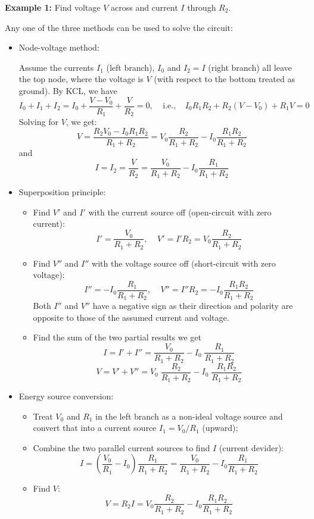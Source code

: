 \begin{itemize}
{\bf Example 1:} Find voltage $V$ across and current $I$ through $R_2$.


Any one of the three methods can be used to solve the circuit:
\begin{itemize}

\item Node-voltage method:

  Assume the currents $I_1$ (left branch), $I_0$ and $I_2=I$ (right branch)
  all leave the top node, where the voltage is $V$ (with respect to the 
  bottom treated as ground). By KCL, we have
  \[
  I_0+I_1+I_2=I_0+\frac{V-V_0}{R_1}+\frac{V}{R_2}=0,\;\;\;\;\mbox{i.e.,}\;\;\;\;
  I_0R_1R_2+R_2(V-V_0)+R_1V=0 
  \]
  Solving for $V$, we get:
  \[
  V=\frac{R_2V_0-I_0R_1R_2}{R_1+R_2}
  =V_0\frac{R_2}{R_1+R_2}-I_0\frac{R_1R_2}{R_1+R_2} 
  \]
  and
  \[
  I=I_2=\frac{V}{R_2}=\frac{V_0}{R_1+R_2}-I_0\frac{R_1}{R_1+R_2} 
  \]


\item Superposition principle:
  \begin{itemize}
  \item Find $V'$ and $I'$ with the current source off (open-circuit with 
    zero current):
    \[ 
    I'=\frac{V_0}{R_1+R_2},\;\;\;\;V'=I'R_2=V_0\frac{R_2}{R_1+R_2} 
    \]
  \item Find $V''$ and $I''$ with the voltage source off (short-circuit with 
    zero voltage):
    \[
    I''=-I_0\frac{R_1}{R_1+R_2},\;\;\;\;V''=I''R_2=-I_0\frac{R_1R_2}{R_1+R_2} 
    \]
    Both $I''$ and $V''$ have a negative sign as their direction and polarity are
    opposite to those of the assumed current and voltage.  
  \item Find the sum of the two partial results we get
    \[
    I=I'+I''=\frac{V_0}{R_1+R_2}-I_0\;\frac{R_1}{R_1+R_2}
    \]
    \[
    V=V'+V''=V_0\;\frac{R_2}{R_1+R_2}-I_0\;\frac{R_1R_2}{R_1+R_2}	
    \]
  \end{itemize}
\item Energy source conversion:

  \begin{itemize}
  \item Treat $V_0$ and $R_1$ in the left branch as a non-ideal voltage
  source and convert that into a current source $I_1=V_0/R_1$ (upward);
  \item Combine the two parallel current sources to find $I$ (current
    devider):
    \[
    I=\left(\frac{V_0}{R_1}-I_0\right)\frac{R_1}{R_1+R_2}
    =\frac{V_0}{R_1+R_2}-I_0\frac{R_1}{R_1+R_2}
    \]
  \item Find $V$:
    \[
    V=R_2I=V_0\frac{R_2}{R_1+R_2}-I_0\frac{R_1R_2}{R_1+R_2}
    \]
  \end{itemize}


\end{itemize}
\end{itemize}
